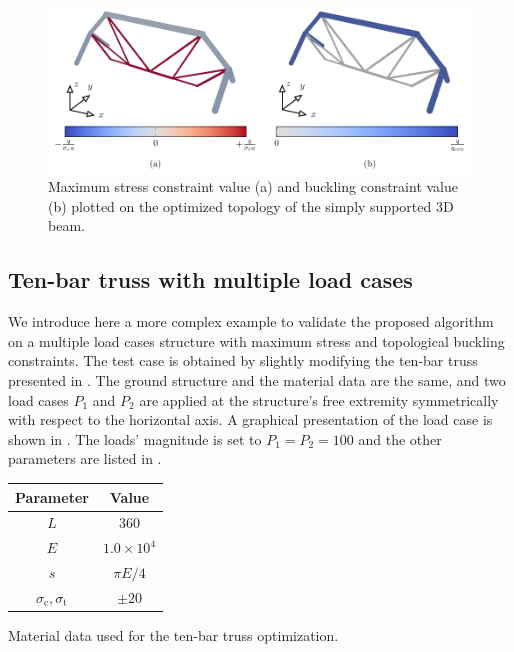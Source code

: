 \begin{figure}
    \centering
    \includegraphics[width=0.90\linewidth]{figures/04_TTO_improvements/17_supported_3D_mech/support_mech.pdf}
    \caption{Maximum stress constraint value (a) and buckling constraint value (b) plotted on the optimized topology of the simply supported 3D beam.}
    \label{fig:04_3D_supp_mech}
\end{figure}

\subsection{Ten-bar truss with multiple load cases}
\label{sec:04_10multi}

We introduce here a more complex example to validate the proposed algorithm on a multiple load cases structure with maximum stress and topological buckling constraints. The test case is obtained by slightly modifying the ten-bar truss presented in . The ground structure and the material data are the same, and two load cases $P_1$ and $P_2$ are applied at the structure's free extremity symmetrically with respect to the horizontal axis. A graphical presentation of the load case is shown in . The loads' magnitude is set to $P_1=P_2=100$ and the other parameters are listed in .
\begin{margintable}
    \small
    \centering
    \begin{tabular}{cc}
    \toprule
    \textbf{Parameter}        & \textbf{Value} \\ \midrule
    $L$ & 360 \\
    $E$              & $1.0 \times 10^{4}$     \\
    $s$ & $\pi E/4$ \\
    $\sigma_\text{c}, \sigma_\text{t}$ & $\pm 20$ \\
    \bottomrule
    \end{tabular}
    \caption{Material data used for the ten-bar truss optimization.}
    \label{tab:04_10-bar_mat_2}
\end{margintable}

